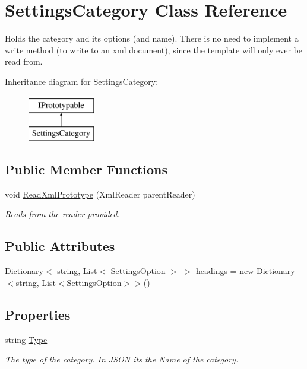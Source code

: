 \hypertarget{class_settings_category}{}\section{Settings\+Category Class Reference}
\label{class_settings_category}


Holds the category and its options (and name). There is no need to implement a write method (to write to an xml document), since the template will only ever be read from.  


Inheritance diagram for Settings\+Category\+:\begin{figure}[H]
\begin{center}
\leavevmode
\includegraphics[height=2.000000cm]{class_settings_category}
\end{center}
\end{figure}
\subsection*{Public Member Functions}
\begin{DoxyCompactItemize}
\item 
void \hyperlink{class_settings_category_a5c32c3b741cc15d6971866bbee00bad8}{Read\+Xml\+Prototype} (Xml\+Reader parent\+Reader)
\begin{DoxyCompactList}\small\item\em Reads from the reader provided. \end{DoxyCompactList}\end{DoxyCompactItemize}
\subsection*{Public Attributes}
\begin{DoxyCompactItemize}
\item 
Dictionary$<$ string, List$<$ \hyperlink{struct_settings_option}{Settings\+Option} $>$ $>$ \hyperlink{class_settings_category_ae29f12a59e2c152efce5cb20ea14b101}{headings} = new Dictionary$<$string, List$<$\hyperlink{struct_settings_option}{Settings\+Option}$>$$>$()
\end{DoxyCompactItemize}
\subsection*{Properties}
\begin{DoxyCompactItemize}
\item 
string \hyperlink{class_settings_category_a8723422438f66d28afc7be0e990d8c10}{Type}
\begin{DoxyCompactList}\small\item\em The type of the category. In J\+S\+ON its the \textquotesingle{}Name\textquotesingle{} of the category. \end{DoxyCompactList}\end{DoxyCompactItemize}


